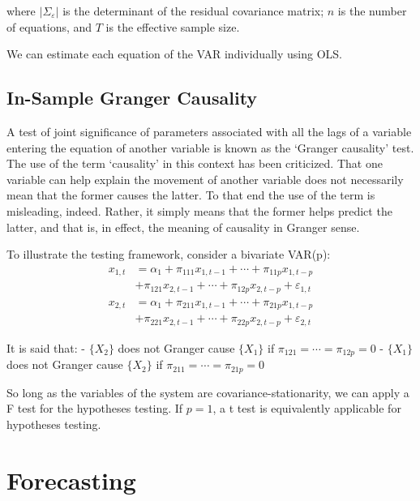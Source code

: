 \documentclass[
  oneside]{book}
\begin{document}
where \(\left|\Sigma_{\varepsilon}\right|\) is the determinant of the residual covariance matrix; \(n\) is the number of equations, and \(T\) is the effective sample size.

We can estimate each equation of the VAR individually using OLS.

\hypertarget{in-sample-granger-causality}{%
\subsection{In-Sample Granger Causality}\label{in-sample-granger-causality}}

A test of joint significance of parameters associated with all the lags of a variable entering the equation of another variable is known as the `Granger causality' test. The use of the term `causality' in this context has been criticized. That one variable can help explain the movement of another variable does not necessarily mean that the former causes the latter. To that end the use of the term is misleading, indeed. Rather, it simply means that the former helps predict the latter, and that is, in effect, the meaning of causality in Granger sense.

To illustrate the testing framework, consider a bivariate VAR(p):
\[\begin{aligned}
x_{1,t} &= \alpha_1 + \pi_{111} x_{1,t-1} + \cdots + \pi_{11p} x_{1,t-p} \\
&+ \pi_{121} x_{2,t-1} + \cdots + \pi_{12p} x_{2,t-p} +\varepsilon_{1,t}  \\
x_{2,t} &= \alpha_1 + \pi_{211} x_{1,t-1} + \cdots + \pi_{21p} x_{1,t-p} \\
&+ \pi_{221} x_{2,t-1} + \cdots + \pi_{22p} x_{2,t-p} +\varepsilon_{2,t} 
\end{aligned}\]

It is said that:
- \(\{X_2\}\) does not Granger cause \(\{X_1\}\) if \(\pi_{121}=\cdots=\pi_{12p}=0\)
- \(\{X_1\}\) does not Granger cause \(\{X_2\}\) if \(\pi_{211}=\cdots=\pi_{21p}=0\)

So long as the variables of the system are covariance-stationarity, we can apply a F test for the hypotheses testing. If \(p=1\), a t test is equivalently applicable for hypotheses testing.

\hypertarget{forecasting-3}{%
\section{Forecasting}\label{forecasting-3}}
\end{document}
